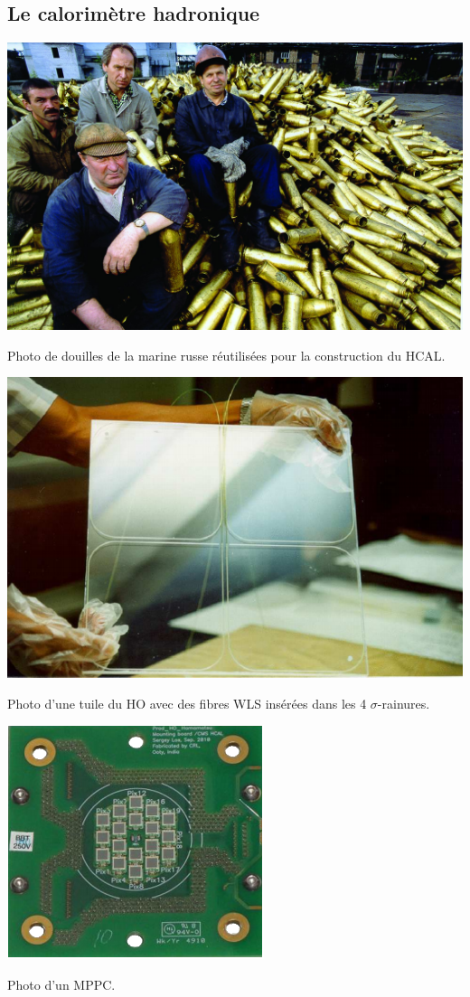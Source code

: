 \subsection{Le calorimètre hadronique}
	\marginpar
{
	\centering
	\includegraphics[width=\marginparwidth]{CMS/LAITON.jpg}
	\captionsetup{type=figure}\caption{Photo de douilles de la marine russe réutilisées pour la construction du HCAL.}
	\label{LAITON}
}
	\marginpar
{
	\centering
	\includegraphics[width=\marginparwidth]{CMS/SCINTI.png}
	\captionsetup{type=figure}\caption{Photo d'une tuile du HO avec des fibres WLS insérées dans les \num{4} $\sigma$-rainures.}
	\label{SCINTI}
}
\marginpar
{
	\centering
	\includegraphics[width=\marginparwidth]{CMS/MPPC.png}
	\captionsetup{type=figure}\caption{Photo d'un MPPC.}
	\label{MPPC}
}
